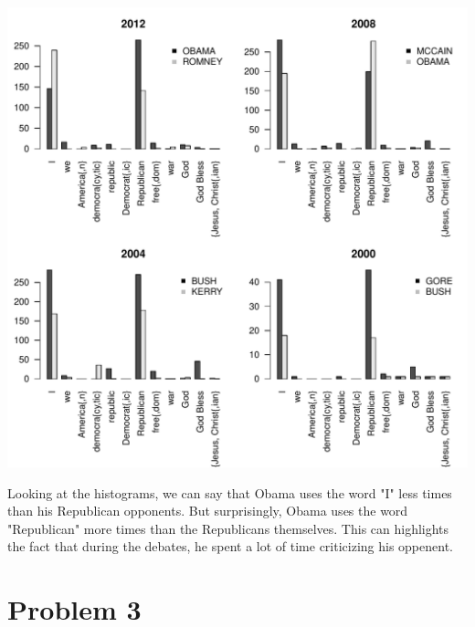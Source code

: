 \documentclass{llncs}\usepackage[]{graphicx}\usepackage[]{color}
\makeatletter
\def\maxwidth{ %
  \ifdim\Gin@nat@width>\linewidth
    \linewidth
  \else
    \Gin@nat@width
  \fi
}
\newenvironment{knitrout}{}{} %
\makeatother
\begin{document}
\begin{knitrout}
\includegraphics[width=\maxwidth]{figure/unnamed-chunk-17-1} 

\end{knitrout}
Looking at the histograms, we can say that Obama uses the word "I" less times than his Republican opponents. But surprisingly, Obama uses the word "Republican" more times than the Republicans themselves. This can highlights the fact that during the debates, he spent a lot of time criticizing his oppenent.
\section{Problem 3}
\end{document}
